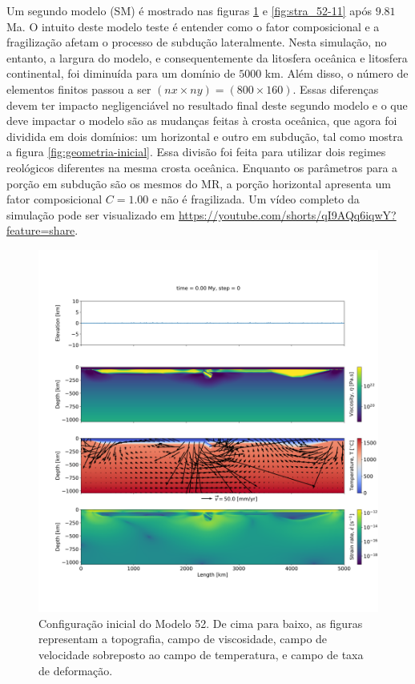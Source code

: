 Um segundo modelo (SM) é mostrado nas figuras \ref{fig:stra_52-00} e \ref{fig:stra_52-11} após $9.81$ Ma. O intuito deste modelo teste é entender como o fator composicional e a fragilização afetam o processo de subdução lateralmente. Nesta simulação, no entanto, a largura do modelo, e consequentemente da litosfera oceânica e litosfera continental, foi diminuída para um domínio de $5000$ km. Além disso, o número de elementos finitos passou a ser $(nx\times ny)=(800\times 160)$. Essas diferenças devem ter impacto negligenciável no resultado final deste segundo modelo e o que deve impactar o modelo são as mudanças feitas à crosta oceânica, que agora foi dividida em dois domínios: um horizontal e outro em subdução, tal como mostra a figura \ref{fig:geometria-inicial}. Essa divisão foi feita para utilizar dois regimes reológicos diferentes na mesma crosta oceânica. Enquanto os parâmetros para a porção em subdução são os mesmos do MR, a porção horizontal apresenta um fator composicional $C=1.00$ e não é fragilizada. Um vídeo completo da simulação pode ser visualizado em \url{https://youtube.com/shorts/qI9AQq6iqwY?feature=share}.

\begin{figure}
    \centering
    \includegraphics[trim={1.5cm 3.5cm 0.0cm 4cm}, clip, width=1.0 \textwidth]{fig/strak_52-00.png}
    \caption{Configuração inicial do Modelo 52. De cima para baixo, as figuras representam a topografia, campo de viscosidade, campo de velocidade sobreposto ao campo de temperatura, e campo de taxa de deformação.}
    \label{fig:stra_52-00}
\end{figure}

